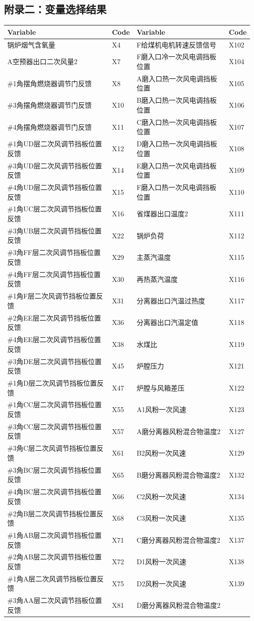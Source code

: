 \documentclass[
]{article}
\begin{document}
\hypertarget{ux9644ux5f55ux4e8cux53d8ux91cfux9009ux62e9ux7ed3ux679c}{%
\subsection{附录二：变量选择结果}\label{ux9644ux5f55ux4e8cux53d8ux91cfux9009ux62e9ux7ed3ux679c}}

\begin{longtable}[]{@{}llll@{}}
\toprule
Variable & Code & Variable & Code\tabularnewline
\midrule
\endhead
锅炉烟气含氧量 & X4 & F给煤机电机转速反馈信号 & X102\tabularnewline
A空预器出口二次风量2 & X7 & F磨入口冷一次风电调挡板位置 &
X104\tabularnewline
\#1角摆角燃烧器调节门反馈 & X8 & A磨入口热一次风电调挡板位置 &
X105\tabularnewline
\#3角摆角燃烧器调节门反馈 & X10 & B磨入口热一次风电调挡板位置 &
X106\tabularnewline
\#4角摆角燃烧器调节门反馈 & X11 & C磨入口热一次风电调挡板位置 &
X107\tabularnewline
\#1角UD层二次风调节挡板位置反馈 & X12 & D磨入口热一次风电调挡板位置 &
X108\tabularnewline
\#3角UD层二次风调节挡板位置反馈 & X14 & E磨入口热一次风电调挡板位置 &
X109\tabularnewline
\#4角UD层二次风调节挡板位置反馈 & X15 & F磨入口热一次风电调挡板位置 &
X110\tabularnewline
\#1角UC层二次风调节挡板位置反馈 & X16 & 省煤器出口温度2 &
X111\tabularnewline
\#3角UB层二次风调节挡板位置反馈 & X22 & 锅炉负荷 & X112\tabularnewline
\#3角FF层二次风调节挡板位置反馈 & X29 & 主蒸汽温度 & X115\tabularnewline
\#4角FF层二次风调节挡板位置反馈 & X30 & 再热蒸汽温度 &
X116\tabularnewline
\#1角F层二次风调节挡板位置反馈 & X31 & 分离器出口汽温过热度 &
X117\tabularnewline
\#2角EE层二次风调节挡板位置反馈 & X36 & 分离器出口汽温定值 &
X118\tabularnewline
\#4角EE层二次风调节挡板位置反馈 & X38 & 水煤比 & X119\tabularnewline
\#3角DE层二次风调节挡板位置反馈 & X45 & 炉膛压力 & X121\tabularnewline
\#1角D层二次风调节挡板位置反馈 & X47 & 炉膛与风箱差压 &
X122\tabularnewline
\#1角CC层二次风调节挡板位置反馈 & X55 & A1风粉一次风速 &
X123\tabularnewline
\#3角CC层二次风调节挡板位置反馈 & X57 & A磨分离器风粉混合物温度2 &
X127\tabularnewline
\#3角C层二次风调节挡板位置反馈 & X61 & B2风粉一次风速 &
X129\tabularnewline
\#3角BC层二次风调节挡板位置反馈 & X65 & B磨分离器风粉混合物温度2 &
X132\tabularnewline
\#4角BC层二次风调节挡板位置反馈 & X66 & C2风粉一次风速 &
X134\tabularnewline
\#2角B层二次风调节挡板位置反馈 & X68 & C3风粉一次风速 &
X135\tabularnewline
\#1角AB层二次风调节挡板位置反馈 & X71 & C磨分离器风粉混合物温度2 &
X137\tabularnewline
\#2角AB层二次风调节挡板位置反馈 & X72 & D1风粉一次风速 &
X138\tabularnewline
\#1角A层二次风调节挡板位置反馈 & X75 & D2风粉一次风速 &
X139\tabularnewline
\#3角AA层二次风调节挡板位置反馈 & X81 & D磨分离器风粉混合物温度2 &

\end{longtable}
\end{document}
